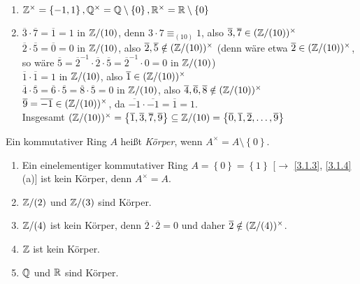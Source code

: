 \documentclass[../../main.tex]{subfiles}
\begin{document}
\begin{bsp}\label{4.1.3}
\begin{enumerate}[\normalfont(a)]
\item $\mathbb Z^\times = \left\{-1,1\right\}, \mathbb Q^\times=\mathbb Q\setminus\left\{0\right\},\mathbb R^\times=\mathbb R\setminus\left\{0\right\}$
\item $\overline{3}\cdot\overline{7}=\overline{1}=1$ in $\mathbb Z/(10)$, denn $3\cdot 7 \equiv_{(10)} 1$, also $\overline{3},\overline{7}\in(\mathbb Z/(10))^\times$\\
$\overline{2}\cdot \overline{5}=\overline{0}=0$ in $\mathbb Z/(10)$, also $\overline{2},\overline{5}\notin(\mathbb Z/(10))^\times$
(denn wäre etwa $\overline2\in(\mathbb Z/(10))^\times$, so wäre $\overline5=\overline2^{-1}\cdot\overline2\cdot\overline5=\overline2^{-1}\cdot0=0$
in $\mathbb Z/(10)$)\\
$\overline{1}\cdot\overline{1}=1$ in $\mathbb Z/(10)$, also $\overline{1}\in(\mathbb Z/(10))^\times$\\
$\overline{4}\cdot\overline{5}=\overline{6}\cdot\overline{5}=\overline{8}\cdot\overline{5}=0$ in $\mathbb Z/(10)$, also $\overline{4},\overline{6},\overline{8}\notin(\mathbb Z/(10))^\times$\\
$\overline{9}=\overline{-1}\in(\mathbb Z/(10))^\times$, da $\overline{-1}\cdot\overline{-1}=\overline{1}=1$.\\
Insgesamt $(\mathbb Z/(10))^\times=\left\{\overline{1},\overline{3},\overline{7},\overline{9}\right\}\subseteq \mathbb Z/(10)=\left\{\overline{0},\overline{1},\overline{2},\ldots,\overline{9}\right\}$
\end{enumerate}
\end{bsp}

\begin{df}\label{4.1.4}
Ein kommutativer Ring $A$ heißt \emph{Körper}, wenn $A^\times=A\setminus\left\{0\right\}$.
\end{df}

\begin{bsp}\label{4.1.5}
\begin{enumerate}[\normalfont(a)]
\item Ein einelementiger kommutativer
Ring $A=\left\{0\right\}=\left\{1\right\}$ [$\to$ \ref{3.1.3}, \ref{3.1.4} (a)] ist kein Körper, denn $A^\times=A$.
\item $\mathbb Z/(2)$ und $\mathbb Z/(3)$ sind Körper.
\item $\mathbb Z/(4)$ ist kein Körper, denn $\overline{2}\cdot\overline{2}=0$ und daher $\overline{2}\notin(\mathbb Z/(4))^\times$.
\item $\mathbb Z$ ist kein Körper.
\item $\mathbb Q$ und $\mathbb R$ sind Körper.
\end{enumerate}
\end{bsp}
\end{document}
